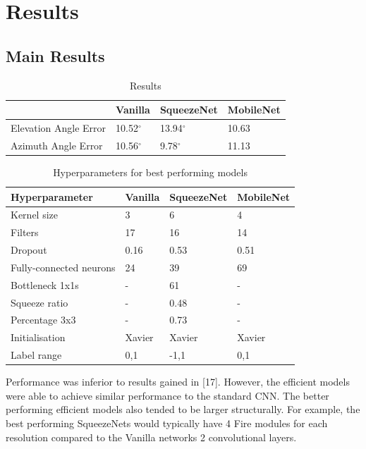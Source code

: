 \documentclass{article}
\begin{document}
\section{Results}

\subsection{Main Results}
\begin{table}[h!]
  \begin{center}
    \caption{Results}
    \label{tab:table1}
    \begin{tabular}{l|l|l|l}
      \textbf{} & \textbf{Vanilla} &                          \textbf{SqueezeNet} & \textbf{MobileNet}\\
      \hline
      Elevation Angle Error & 10.52$^{\circ}$ & 13.94$^{\circ}$ & 10.63\\
      Azimuth Angle Error & 10.56$^{\circ}$  & 9.78$^{\circ}$ & 11.13\\

    \end{tabular}
  \end{center}
\end{table}

\begin{table}[h!]
  \begin{center}
    \caption{Hyperparameters for best performing models}
    \label{tab:params}
    \begin{tabular}{l|l|l|l}
      \textbf{Hyperparameter} & \textbf{Vanilla} &                          \textbf{SqueezeNet} & \textbf{MobileNet}\\
      \hline
      Kernel size & 3 & 6 & 4\\
      Filters & 17 & 16 & 14\\
      Dropout & 0.16 & 0.53 & 0.51\\
      Fully-connected neurons & 24 & 39 & 69\\
      Bottleneck 1x1s & - & 61 & - \\
      Squeeze ratio & - & 0.48 & - \\
      Percentage 3x3 & - & 0.73 & - \\
      Initialisation & Xavier & Xavier & Xavier \\
      Label range & 0,1 & -1,1 & 0,1
    \end{tabular}
  \end{center}
\end{table}

Performance was inferior to results gained in [17]. However, the efficient models were able to achieve similar performance to the standard CNN. The better performing efficient models also tended to be larger structurally. For example, the best performing SqueezeNets would typically have 4 Fire modules for each resolution compared to the Vanilla networks 2 convolutional layers.\\
\end{document}
